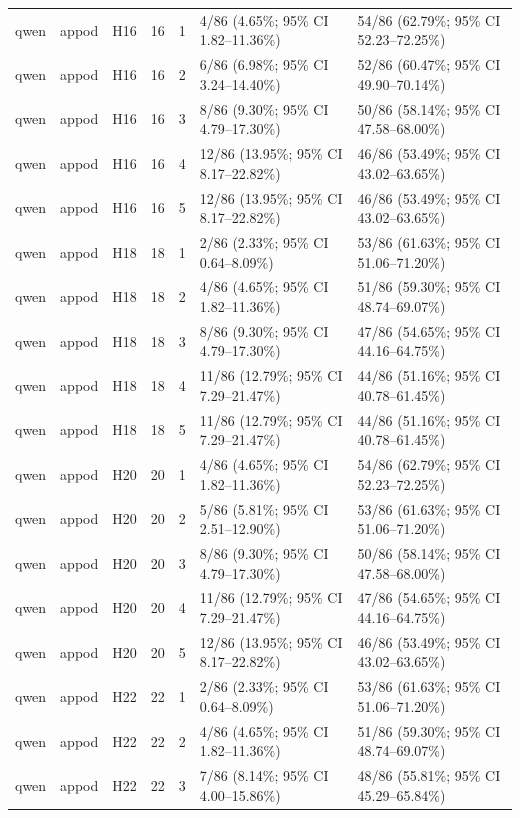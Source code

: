 \begin{longtable}{lllrrll}
qwen & appod & H16 & 16 & 1 & 4/86 (4.65\%; 95\% CI 1.82–11.36\%) & 54/86 (62.79\%; 95\% CI 52.23–72.25\%) \\
qwen & appod & H16 & 16 & 2 & 6/86 (6.98\%; 95\% CI 3.24–14.40\%) & 52/86 (60.47\%; 95\% CI 49.90–70.14\%) \\
qwen & appod & H16 & 16 & 3 & 8/86 (9.30\%; 95\% CI 4.79–17.30\%) & 50/86 (58.14\%; 95\% CI 47.58–68.00\%) \\
qwen & appod & H16 & 16 & 4 & 12/86 (13.95\%; 95\% CI 8.17–22.82\%) & 46/86 (53.49\%; 95\% CI 43.02–63.65\%) \\
qwen & appod & H16 & 16 & 5 & 12/86 (13.95\%; 95\% CI 8.17–22.82\%) & 46/86 (53.49\%; 95\% CI 43.02–63.65\%) \\
qwen & appod & H18 & 18 & 1 & 2/86 (2.33\%; 95\% CI 0.64–8.09\%) & 53/86 (61.63\%; 95\% CI 51.06–71.20\%) \\
qwen & appod & H18 & 18 & 2 & 4/86 (4.65\%; 95\% CI 1.82–11.36\%) & 51/86 (59.30\%; 95\% CI 48.74–69.07\%) \\
qwen & appod & H18 & 18 & 3 & 8/86 (9.30\%; 95\% CI 4.79–17.30\%) & 47/86 (54.65\%; 95\% CI 44.16–64.75\%) \\
qwen & appod & H18 & 18 & 4 & 11/86 (12.79\%; 95\% CI 7.29–21.47\%) & 44/86 (51.16\%; 95\% CI 40.78–61.45\%) \\
qwen & appod & H18 & 18 & 5 & 11/86 (12.79\%; 95\% CI 7.29–21.47\%) & 44/86 (51.16\%; 95\% CI 40.78–61.45\%) \\
qwen & appod & H20 & 20 & 1 & 4/86 (4.65\%; 95\% CI 1.82–11.36\%) & 54/86 (62.79\%; 95\% CI 52.23–72.25\%) \\
qwen & appod & H20 & 20 & 2 & 5/86 (5.81\%; 95\% CI 2.51–12.90\%) & 53/86 (61.63\%; 95\% CI 51.06–71.20\%) \\
qwen & appod & H20 & 20 & 3 & 8/86 (9.30\%; 95\% CI 4.79–17.30\%) & 50/86 (58.14\%; 95\% CI 47.58–68.00\%) \\
qwen & appod & H20 & 20 & 4 & 11/86 (12.79\%; 95\% CI 7.29–21.47\%) & 47/86 (54.65\%; 95\% CI 44.16–64.75\%) \\
qwen & appod & H20 & 20 & 5 & 12/86 (13.95\%; 95\% CI 8.17–22.82\%) & 46/86 (53.49\%; 95\% CI 43.02–63.65\%) \\
qwen & appod & H22 & 22 & 1 & 2/86 (2.33\%; 95\% CI 0.64–8.09\%) & 53/86 (61.63\%; 95\% CI 51.06–71.20\%) \\
qwen & appod & H22 & 22 & 2 & 4/86 (4.65\%; 95\% CI 1.82–11.36\%) & 51/86 (59.30\%; 95\% CI 48.74–69.07\%) \\
qwen & appod & H22 & 22 & 3 & 7/86 (8.14\%; 95\% CI 4.00–15.86\%) & 48/86 (55.81\%; 95\% CI 45.29–65.84\%) \\

\end{longtable}
